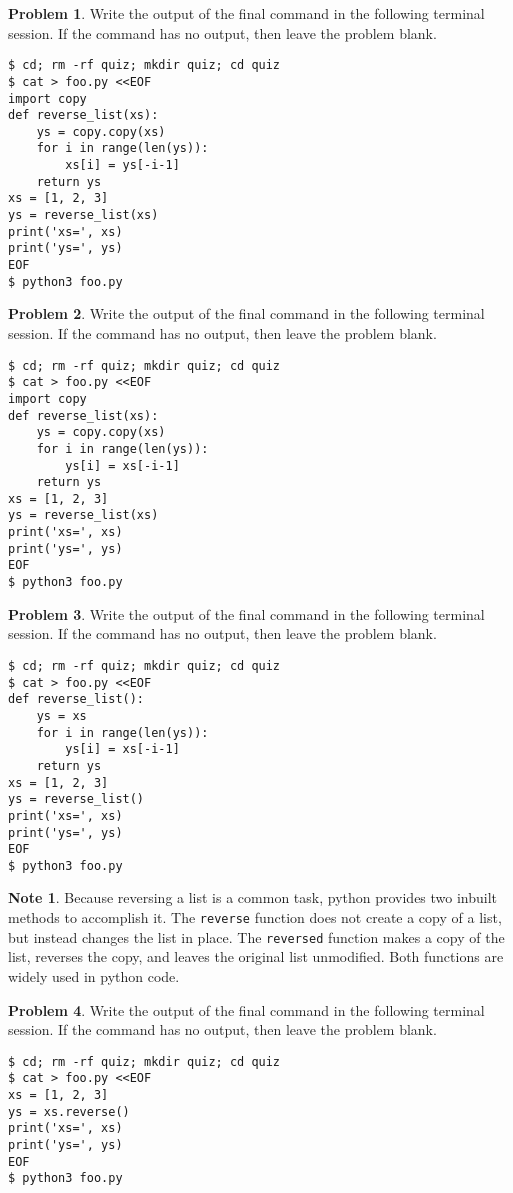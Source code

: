 \documentclass[10pt]{article}
\theoremstyle{definition}
\newtheorem{problem}{Problem}
\newtheorem{note}{Note}
\begin{document}
\filbreak
\begin{problem}
    Write the output of the final command in the following terminal session.
    If the command has no output, then leave the problem blank.
\end{problem}
\begin{lstlisting}
$ cd; rm -rf quiz; mkdir quiz; cd quiz
$ cat > foo.py <<EOF
import copy
def reverse_list(xs):
    ys = copy.copy(xs)
    for i in range(len(ys)):
        xs[i] = ys[-i-1]
    return ys
xs = [1, 2, 3]
ys = reverse_list(xs)
print('xs=', xs)
print('ys=', ys)
EOF
$ python3 foo.py
\end{lstlisting}


\filbreak
\begin{problem}
    Write the output of the final command in the following terminal session.
    If the command has no output, then leave the problem blank.
\end{problem}
\begin{lstlisting}
$ cd; rm -rf quiz; mkdir quiz; cd quiz
$ cat > foo.py <<EOF
import copy
def reverse_list(xs):
    ys = copy.copy(xs)
    for i in range(len(ys)):
        ys[i] = xs[-i-1]
    return ys
xs = [1, 2, 3]
ys = reverse_list(xs)
print('xs=', xs)
print('ys=', ys)
EOF
$ python3 foo.py
\end{lstlisting}


\filbreak
\begin{problem}
    Write the output of the final command in the following terminal session.
    If the command has no output, then leave the problem blank.
\end{problem}
\begin{lstlisting}
$ cd; rm -rf quiz; mkdir quiz; cd quiz
$ cat > foo.py <<EOF
def reverse_list():
    ys = xs
    for i in range(len(ys)):
        ys[i] = xs[-i-1]
    return ys
xs = [1, 2, 3]
ys = reverse_list()
print('xs=', xs)
print('ys=', ys)
EOF
$ python3 foo.py
\end{lstlisting}

\begin{note}
Because reversing a list is a common task,
python provides two inbuilt methods to accomplish it.
The \texttt{reverse} function does not create a copy of a list, but instead changes the list in place.
The \texttt{reversed} function makes a copy of the list, reverses the copy, and leaves the original list unmodified.
Both functions are widely used in python code.
\end{note}

\filbreak
\begin{problem}
    Write the output of the final command in the following terminal session.
    If the command has no output, then leave the problem blank.
\end{problem}
\begin{lstlisting}
$ cd; rm -rf quiz; mkdir quiz; cd quiz
$ cat > foo.py <<EOF
xs = [1, 2, 3]
ys = xs.reverse()
print('xs=', xs)
print('ys=', ys)
EOF
$ python3 foo.py
\end{lstlisting}
\end{document}
